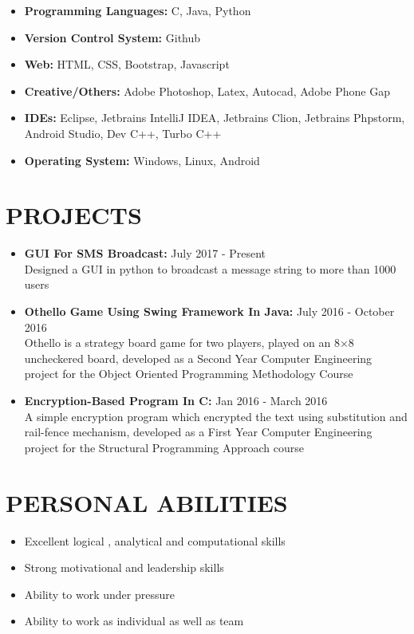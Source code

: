 \documentclass[11pt]{article} %
\newcommand{\NewPart}[1]{\section*{\uppercase{#1}}}
\begin{document}
\begin{itemize}
\itemsep-0.5em 
\item \textbf{Programming Languages:} C, Java, Python

\item \textbf{Version Control System:} Github
\vspace{0pt}

\item \textbf{Web:} HTML, CSS, Bootstrap, Javascript
\item \textbf{Creative/Others:} Adobe Photoshop, Latex, Autocad, Adobe Phone Gap

\item \textbf{IDEs:}  Eclipse, Jetbrains IntelliJ IDEA, Jetbrains Clion, Jetbrains Phpstorm, Android Studio, Dev C++, Turbo C++

\item \textbf{Operating System:} Windows, Linux, Android

\end{itemize}



\NewPart{    Projects}{}
\begin{itemize}
\itemsep-0.5em
\item \textbf{GUI For SMS Broadcast: }\hfill {July 2017 - Present}
\\Designed a GUI in python to broadcast a message string to more than 1000 users
\item \textbf{Othello Game Using Swing Framework In Java: }\hfill {July 2016 - October 2016}
\\Othello is a strategy board game for two players, played on an 8×8 uncheckered board, developed as a Second Year Computer Engineering project for the Object Oriented Programming Methodology Course 
\item \textbf{Encryption-Based Program In C: }\hfill {Jan 2016 - March 2016}\\A simple encryption program which encrypted the text using substitution and rail-fence mechanism, developed as a First Year Computer Engineering project for the Structural Programming Approach course
\end{itemize}


\NewPart{    Personal Abilities}{}

\begin{itemize}
\itemsep-0.5em 
\item Excellent logical , analytical and computational skills
\item Strong motivational and leadership skills
\item Ability to work under pressure 
\item Ability to work as individual as well as team 
\end{itemize}
\end{document}
